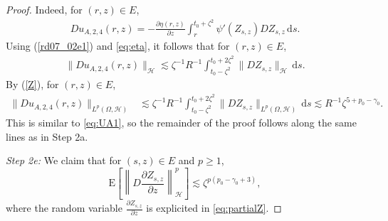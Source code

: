 \documentclass[10pt,a4paper]{amsart}
\newcommand {\deltah}{{\zeta}}
\newcommand{\E}{\mathrm{E}}
\renewcommand{\d}{\mathrm{d}}
\begin{document}
\begin{proof}
 Indeed, for $(r,z)\in E$,
           \begin{align*}
           Du_{A,2,4}(r,z) =- \frac{\partial \eta(r,z)}{\partial z} \int_r^{t_0+\deltah^2} \psi'(Z_{s,z})DZ_{s,z}\, \d s. 
           \end{align*}
Using (\ref{rd07_02e1}) and \eqref{eq:eta},  it follows that for $(r,z)\in E$, 
           \begin{align*}
           \|Du_{A,2,4}(r,z)\|_{\mathcal{H}} \lesssim \deltah^{-1} R^{-1} \int_{t_0-\deltah^2}^{t_0+2\deltah^2}\|DZ_{s,z}\|_{\mathcal{H}}\, \d s.
           \end{align*}
           By (\ref{Z}), for $(r,z)\in E$,
           \begin{align*}
           \|Du_{A,2,4}(r,z)\|_{L^p(\Omega, \mathcal{H})}& \lesssim \deltah^{-1} R^{-1} \int_{t_0-\deltah^2}^{t_0+2\deltah^2}\|DZ_{s,z}\|_{L^p(\Omega, \mathcal{H})}\, \d s
           \lesssim  R^{-1}\deltah^{5+p_0-\gamma_0}.
           \end{align*}
This is similar to \eqref{eq:UA1}, so the remainder of the proof follows along the same lines 
           as in Step 2a.
 
   \medskip
 \noindent
 {\it Step 2e:} We claim that for $(s,z)\in E$ and $p\geq1$,  
            \begin{equation} \label{partialZ}
             \E\left[\left\|D\frac{\partial Z_{s,z}}{\partial z}\right\|_{\mathcal{H}}^p \right] \lesssim \deltah^{p(p_0-\gamma_0+3)},
           \end{equation}
           where  the random variable $\frac{\partial Z_{s, z}}{\partial z}$ is explicited in \eqref{eq:partialZ}.
           

\end{proof}
\end{document}
